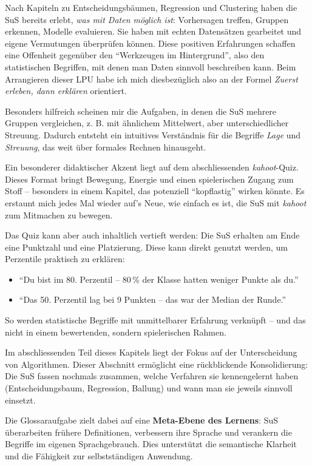 Nach Kapiteln zu Entscheidungsbäumen, Regression und Clustering haben die SuS bereits erlebt, \emph{was mit Daten möglich ist}: Vorhersagen treffen, Gruppen erkennen, Modelle evaluieren. Sie haben mit echten Datensätzen gearbeitet und eigene Vermutungen überprüfen können. Diese positiven Erfahrungen schaffen eine Offenheit gegenüber den ``Werkzeugen im Hintergrund'', also den statistischen Begriffen, mit denen man Daten sinnvoll beschreiben kann. Beim Arrangieren dieser LPU habe ich mich diesbezüglich also an der Formel \emph{Zuerst erleben, dann erklären} orientiert.

Besonders hilfreich scheinen mir die Aufgaben, in denen die SuS mehrere Gruppen vergleichen, z. B. mit ähnlichem Mittelwert, aber unterschiedlicher Streuung. Dadurch entsteht ein intuitives Verständnis für die Begriffe \emph{Lage} und \emph{Streuung}, das weit über formales Rechnen hinausgeht.

Ein besonderer didaktischer Akzent liegt auf dem abschliessenden \textit{kahoot}-Quiz. Dieses Format bringt Bewegung, Energie und einen spielerischen Zugang zum Stoff – besonders in einem Kapitel, das potenziell ``kopflastig'' wirken könnte. Es erstaunt mich jedes Mal wieder auf's Neue, wie einfach es ist, die SuS mit \textit{kahoot} zum Mitmachen zu bewegen.

Das Quiz kann aber auch inhaltlich vertieft werden: Die SuS erhalten am Ende eine Punktzahl und eine Platzierung. Diese kann direkt genutzt werden, um Perzentile praktisch zu erklären:

\begin{itemize}
  \item ``Du bist im 80. Perzentil – 80\,\% der Klasse hatten weniger Punkte als du.''
  \item ``Das 50. Perzentil lag bei 9 Punkten – das war der Median der Runde.''
\end{itemize}

So werden statistische Begriffe mit unmittelbarer Erfahrung verknüpft – und das nicht in einem bewertenden, sondern spielerischen Rahmen. 

Im abschliessenden Teil dieses Kapitels liegt der Fokus auf der Unterscheidung von Algorithmen. Dieser Abschnitt ermöglicht eine rückblickende Konsolidierung: Die SuS fassen nochmals zusammen, welche Verfahren sie kennengelernt haben (Entscheidungsbaum, Regression, Ballung) und wann man sie jeweils sinnvoll einsetzt.

Die Glossaraufgabe zielt dabei auf eine \textbf{Meta-Ebene des Lernens}: SuS überarbeiten frühere Definitionen, verbessern ihre Sprache und verankern die Begriffe im eigenen Sprachgebrauch. Dies unterstützt die semantische Klarheit und die Fähigkeit zur selbstständigen Anwendung.

